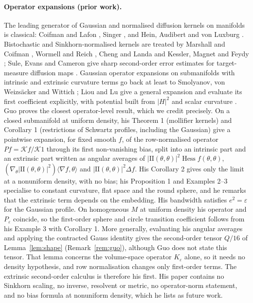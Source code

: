 \documentclass[11pt,a4paper]{article}
\theoremstyle{definition}\newtheorem{definition}[theorem]{Definition}
\theoremstyle{remark}\newtheorem{remark}[theorem]{Remark}
\newcommand{\eps}{\varepsilon}
\newcommand{\II}{\mathrm{II}}
\begin{document}
\paragraph{Operator expansions (prior work).} The leading generator of Gaussian and normalised diffusion kernels on manifolds is classical: Coifman and Lafon \cite{CoifmanLafon}, Singer \cite{Singer}, and Hein, Audibert and von Luxburg \cite{HAvL2005,HAvL2007}. Bistochastic and Sinkhorn-normalised kernels are treated by Marshall and Coifman \cite{MC}, Wormell and Reich \cite{WR}, Cheng and Landa \cite{CL} and Kessler, Magnet and Feydy \cite{Kessler}; Sule, Evans and Cameron give sharp second-order error estimates for target-measure diffusion maps \cite{SEC}. Gaussian operator expansions on submanifolds with intrinsic and extrinsic curvature terms go back at least to Smolyanov, von Weizs\"acker and Wittich \cite{SWW}; Liou and Lu give a general expansion and evaluate its first coefficient explicitly, with potential built from $|H|^2$ and scalar curvature \cite[Theorem 3.2]{LiouLu}. Guo \cite{Guo} proves the closest operator-level result, which we credit precisely. On a closed submanifold at uniform density, his Theorem 1 (mollifier kernels) and Corollary 1 (restrictions of Schwartz profiles, including the Gaussian) give a pointwise expansion, for fixed smooth $f$, of the row-normalised operator $P f=\mathcal K f/\mathcal K1$ through its first non-vanishing bias, split into an intrinsic part and an extrinsic part written as angular averages of $|\II(\theta,\theta)|^2\operatorname{Hess}f(\theta,\theta)$, $(\nabla_\theta|\II(\theta,\theta)|^2)\langle\nabla f,\theta\rangle$ and $|\II(\theta,\theta)|^2\Delta f$. His Corollary 2 gives only the limit at a nonuniform density, with no bias; his Proposition 1 and Examples 2--3 specialise to constant curvature, flat space and the round sphere, and he remarks that the extrinsic term depends on the embedding. His bandwidth satisfies $e^2=\eps$ for the Gaussian profile. On homogeneous $M$ at uniform density his operator and $P_\eps$ coincide, so the first-order sphere and circle transition coefficient follows from his Example 3 with Corollary 1. More generally, evaluating his angular averages and applying the contracted Gauss identity gives the second-order tensor $Q/16$ of Lemma~\ref{lem:shape} (Remark~\ref{rem:guo}), although Guo does not state this tensor. That lemma concerns the volume-space operator $K_\eps$ alone, so it needs no density hypothesis, and row normalisation changes only first-order terms. The extrinsic second-order calculus is therefore his first. His paper contains no Sinkhorn scaling, no inverse, resolvent or metric, no operator-norm statement, and no bias formula at nonuniform density, which he lists as future work.
\end{document}
